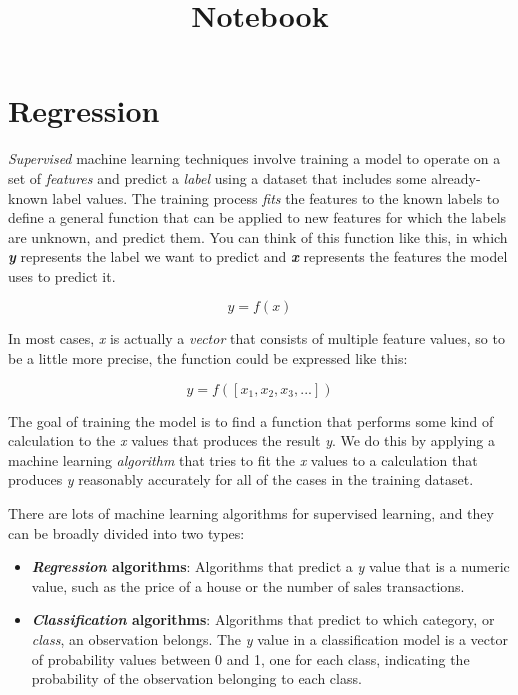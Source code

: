 \documentclass[11pt]{article}
\title{Notebook}
\providecommand{\tightlist}{%
      \setlength{\itemsep}{0pt}\setlength{\parskip}{0pt}}
\begin{document}
    
    \maketitle
    
    

    
    \hypertarget{regression}{%
\section{Regression}\label{regression}}

\emph{Supervised} machine learning techniques involve training a model
to operate on a set of \emph{features} and predict a \emph{label} using
a dataset that includes some already-known label values. The training
process \emph{fits} the features to the known labels to define a general
function that can be applied to new features for which the labels are
unknown, and predict them. You can think of this function like this, in
which \textbf{\emph{y}} represents the label we want to predict and
\textbf{\emph{x}} represents the features the model uses to predict it.

\[y = f(x)\]

In most cases, \emph{x} is actually a \emph{vector} that consists of
multiple feature values, so to be a little more precise, the function
could be expressed like this:

\[y = f([x_1, x_2, x_3, ...])\]

The goal of training the model is to find a function that performs some
kind of calculation to the \emph{x} values that produces the result
\emph{y}. We do this by applying a machine learning \emph{algorithm}
that tries to fit the \emph{x} values to a calculation that produces
\emph{y} reasonably accurately for all of the cases in the training
dataset.

There are lots of machine learning algorithms for supervised learning,
and they can be broadly divided into two types:

\begin{itemize}
\tightlist
\item
  \textbf{\emph{Regression} algorithms}: Algorithms that predict a
  \emph{y} value that is a numeric value, such as the price of a house
  or the number of sales transactions.
\item
  \textbf{\emph{Classification} algorithms}: Algorithms that predict to
  which category, or \emph{class}, an observation belongs. The \emph{y}
  value in a classification model is a vector of probability values
  between 0 and 1, one for each class, indicating the probability of the
  observation belonging to each class.
\end{itemize}
\end{document}
